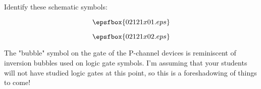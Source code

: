 

Identify these schematic symbols:

$$\epsfbox{02121x01.eps}$$







$$\epsfbox{02121x02.eps}$$







The "bubble" symbol on the gate of the P-channel devices is reminiscent of inversion bubbles used on logic gate symbols.  I'm assuming that your students will not have studied logic gates at this point, so this is a foreshadowing of things to come!




